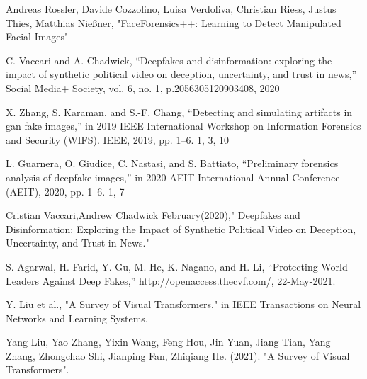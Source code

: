 \begin{thebibliography}{99}
        \item\label{ref1} Andreas Rossler, Davide Cozzolino, Luisa Verdoliva, Christian Riess, Justus Thies, Matthias Nießner, "FaceForensics++: Learning to Detect Manipulated Facial Images"

        \item\label{ref2} C. Vaccari and A. Chadwick, “Deepfakes and disinformation: exploring the impact of synthetic political video on deception, uncertainty, and trust in news,” Social Media+ Society, vol. 6, no. 1, p.2056305120903408, 2020
    
        \item\label{ref3} X. Zhang, S. Karaman, and S.-F. Chang, “Detecting and simulating artifacts in gan fake images,” in 2019 IEEE International Workshop on Information Forensics and Security (WIFS). IEEE, 2019, pp. 1–6. 1, 3, 10
    
        \item\label{ref4}  L. Guarnera, O. Giudice, C. Nastasi, and S. Battiato, “Preliminary forensics analysis of deepfake images,” in 2020 AEIT International Annual Conference (AEIT), 2020, pp. 1–6. 1, 7
        
        \item\label{ref5}Cristian Vaccari,Andrew Chadwick February(2020)," Deepfakes and Disinformation: Exploring the Impact of Synthetic Political Video on Deception, Uncertainty, and Trust in News."

        \item\label{ref6} S. Agarwal, H. Farid, Y. Gu, M. He, K. Nagano, and H. Li, “Protecting World 
    Leaders Against Deep Fakes,” http://openaccess.thecvf.com/,  22-May-2021.
    

    \item\label{ref7}Y. Liu et al., "A Survey of Visual Transformers," in IEEE Transactions on Neural Networks and Learning Systems.
    
    \item\label{ref8} Yang Liu, Yao Zhang, Yixin Wang, Feng Hou, Jin Yuan,
    Jiang Tian, Yang Zhang, Zhongchao Shi, Jianping Fan, Zhiqiang He. (2021). "A Survey of Visual Transformers".


\end{thebibliography}
